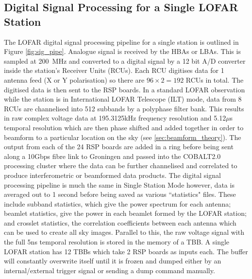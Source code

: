 \subsection{Digital Signal Processing for a Single LOFAR Station}
\label{sec:sig_pipe}
The LOFAR digital signal processing pipeline for a single station is outlined in Figure \ref{fig:sig_pipe}. Analogue signal is received by the HBAs or LBAs. This is sampled at 200~MHz and converted to a digital signal by a 12 bit A/D converter inside the station's Receiver Units (RCUs). Each RCU digitises data for 1 antenna feed (X or Y polarisation) so there are $96 \times 2 = 192$ RCUs in total. The digitised data is then sent to the RSP boards. In a standard LOFAR observation while the station is in International LOFAR Telescope (ILT) mode, data from 8 RCUs are channelised into 512 subbands by a polyphase filter bank. This results in raw complex voltage data at 195.3125kHz frequency resolution and 5.12$\mu$s temporal resolution which are then phase shifted and added together in order to beamform to a particular location on the sky (see \ref{sec:beamform_theory}). The output from each of the 24 RSP boards are added in a ring before being sent along a 10Gbps fibre link to Groningen and passed into the COBALT2.0 processing cluster where the data can be further channelised and correlated to produce interferometric or beamformed data products.
The digital signal processing pipeline is much the same in Single Station Mode however, data is averaged out to 1 second before being saved as various ``statistics" files. These include subband statistics, which give the power spectrum for each antenna; beamlet statistics, give the power in each beamlet formed by the LOFAR station; and crosslet statistics, the correlation coefficients between each antenna which can be used to create all sky images.
Parallel to this, the raw voltage signal with the full 5ns temporal resolution is stored in the memory of a TBB. A single LOFAR station has 12 TBBs which take 2 RSP boards as inputs each. The buffer will constantly overwrite itself until it is frozen and dumped either by an internal/external trigger signal or sending a dump command manually.

